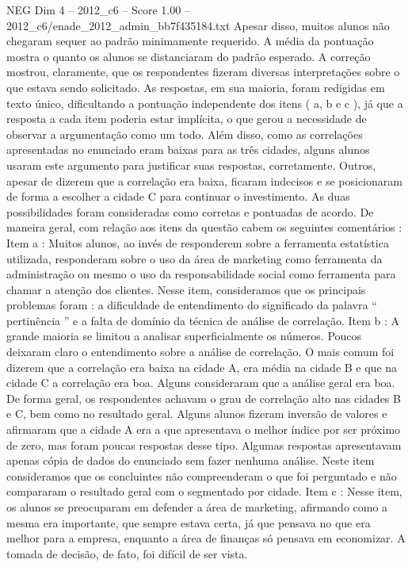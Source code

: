 \begin{textsample}{NEG Dim 4 – 2012\_c6 – Score 1.00 – 2012\_c6/enade\_2012\_admin\_bb7f435184.txt}
Apesar disso, muitos alunos não chegaram sequer ao padrão minimamente requerido.
A média da pontuação mostra o quanto os alunos se distanciaram do padrão esperado.
A correção mostrou, claramente, que os respondentes fizeram diversas interpretações sobre o que estava sendo solicitado.
As respostas, em sua maioria, foram redigidas em texto único, dificultando a pontuação independente dos itens ( a, b e c ), já que a resposta a cada item poderia estar implícita, o que gerou a necessidade de observar a argumentação como um todo.
Além disso, como as correlações apresentadas no enunciado eram baixas para as três cidades, alguns alunos usaram este argumento para justificar suas respostas, corretamente.
Outros, apesar de dizerem que a correlação era baixa, ficaram indecisos e se posicionaram de forma a escolher a cidade C para continuar o investimento.
As duas possibilidades foram consideradas como corretas e pontuadas de acordo.
De maneira geral, com relação aos itens da questão cabem os seguintes comentários : Item a : Muitos alunos, ao invés de responderem sobre a ferramenta estatística utilizada, responderam sobre o uso da área de marketing como ferramenta da administração ou mesmo o uso da responsabilidade social como ferramenta para chamar a atenção dos clientes.
Nesse item, consideramos que os principais problemas foram : a dificuldade de entendimento do significado da palavra “ pertinência ” e a falta de domínio da técnica de análise de correlação.
Item b : A grande maioria se limitou a analisar superficialmente os números.
Poucos deixaram claro o entendimento sobre a análise de correlação.
O mais comum foi dizerem que a correlação era baixa na cidade A, era média na cidade B e que na cidade C a correlação era boa.
Alguns consideraram que a análise geral era boa.
De forma geral, os respondentes achavam o grau de correlação alto nas cidades B e C, bem como no resultado geral.
Alguns alunos fizeram inversão de valores e afirmaram que a cidade A era a que apresentava o melhor índice por ser próximo de zero, mas foram poucas respostas desse tipo.
Algumas respostas apresentavam apenas cópia de dados do enunciado sem fazer nenhuma análise.
Neste item consideramos que os concluintes não compreenderam o que foi perguntado e não compararam o resultado geral com o segmentado por cidade.
Item c : Nesse item, os alunos se preocuparam em defender a área de marketing, afirmando como a mesma era importante, que sempre estava certa, já que pensava no que era melhor para a empresa, enquanto a área de finanças só pensava em economizar.
A tomada de decisão, de fato, foi difícil de ser vista.

\end{textsample}
